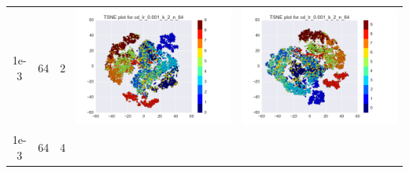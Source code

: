 \documentclass[12pt]{report}
\begin{document}
\begin{table}[H]
\begin{tabular}{ | c | c | c | c || c |}
\begin{minipage}{.3\textwidth}
    \end{minipage}
    \\ \hline
    1e-3 & 64 & 2 &
    \begin{minipage}{.3\textwidth}
      \includegraphics[scale=0.25]{cd_lr_0_001_k_2_n_64.png}
    \end{minipage} &
    \begin{minipage}{.3\textwidth}
      \includegraphics[scale=0.25]{test_cd_lr_0_001_k_2_n_64.png}
    \end{minipage}
    \\ \hline
    1e-3 & 64 & 4 &
    \begin{minipage}{.3\textwidth}

\end{minipage}
\end{tabular}
\end{table}
\end{document}
